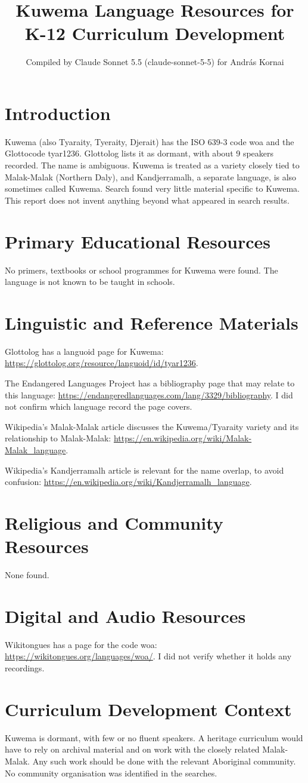 \documentclass[12pt]{article}
\title{Kuwema Language Resources for K-12 Curriculum Development}
\author{Compiled by Claude Sonnet 5.5 (claude-sonnet-5-5) for Andr\'as Kornai}
\date{}
\begin{document}
\maketitle

\section{Introduction}
Kuwema (also Tyaraity, Tyeraity, Djerait) has the ISO 639-3 code woa and the Glottocode tyar1236. Glottolog lists it as dormant, with about 9 speakers recorded. The name is ambiguous. Kuwema is treated as a variety closely tied to Malak-Malak (Northern Daly), and Kandjerramalh, a separate language, is also sometimes called Kuwema. Search found very little material specific to Kuwema. This report does not invent anything beyond what appeared in search results.

\section{Primary Educational Resources}
No primers, textbooks or school programmes for Kuwema were found. The language is not known to be taught in schools.

\section{Linguistic and Reference Materials}
Glottolog has a languoid page for Kuwema: \url{https://glottolog.org/resource/languoid/id/tyar1236}.

The Endangered Languages Project has a bibliography page that may relate to this language: \url{https://endangeredlanguages.com/lang/3329/bibliography}. I did not confirm which language record the page covers.

Wikipedia's Malak-Malak article discusses the Kuwema/Tyaraity variety and its relationship to Malak-Malak: \url{https://en.wikipedia.org/wiki/Malak-Malak_language}.

Wikipedia's Kandjerramalh article is relevant for the name overlap, to avoid confusion: \url{https://en.wikipedia.org/wiki/Kandjerramalh_language}.

\section{Religious and Community Resources}
None found.

\section{Digital and Audio Resources}
Wikitongues has a page for the code woa: \url{https://wikitongues.org/languages/woa/}. I did not verify whether it holds any recordings.

\section{Curriculum Development Context}
Kuwema is dormant, with few or no fluent speakers. A heritage curriculum would have to rely on archival material and on work with the closely related Malak-Malak. Any such work should be done with the relevant Aboriginal community. No community organisation was identified in the searches.
\end{document}
